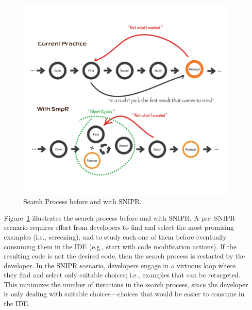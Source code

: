 \begin{figure}[!ht]
    \centering
    \includegraphics[width=\textwidth]{images/searchprocess}
    \caption{Search Process before and with \uppercase{SnipR}.}
    \label{fig:retargeting}
\end{figure}

Figure~\ref{fig:retargeting} illustrates the search process before and with \uppercase{SnipR}. A pre--\uppercase{SnipR} scenario requires effort from developers to find and select the most promising examples (i.e., screening), and to study each one of them before eventually consuming them in the IDE (e.g., start with code modification actions). If the resulting code is not the desired code, then the search process is restarted by the developer. In the \uppercase{SnipR} scenario, developers engage in a virtuous loop where they find and select only suitable choices; i.e., examples that can be retargeted. This minimizes the number of iterations in the search process, since the developer is only dealing with suitable choices---choices that would be easier to consume in the IDE.


